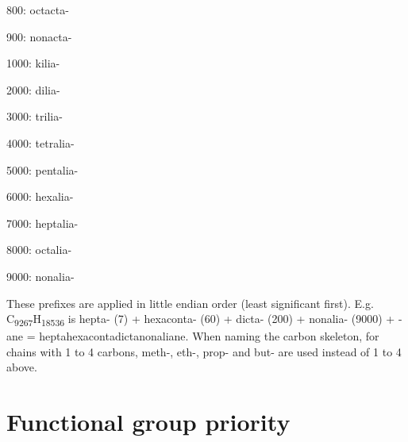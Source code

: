 800: octacta-

900: nonacta-

1000: kilia-

2000: dilia-

3000: trilia-

4000: tetralia-

5000: pentalia-

6000: hexalia-

7000: heptalia-

8000: octalia-

9000: nonalia-

These prefixes are applied in little endian order (least significant
first). E.g. C\textsubscript{9267}H\textsubscript{18536} is hepta- (7) +
hexaconta- (60) + dicta- (200) + nonalia- (9000) + -ane =
heptahexacontadictanonaliane. When naming the carbon skeleton, for
chains with 1 to 4 carbons, meth-, eth-, prop- and but- are used instead
of 1 to 4 above.

\section{Functional group priority}

